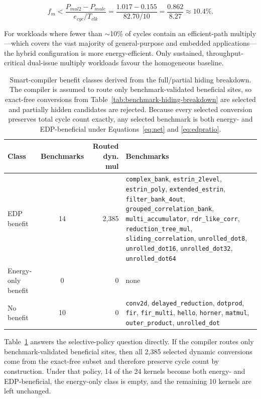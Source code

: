 \begin{equation}\label{eq:breakeven}
  f_m < \frac{P_{\mathit{mul2}} - P_{\mathit{mule}}}
             {e_{\mathit{cyc}} / T_{\mathit{clk}}}
      = \frac{1.017 - 0.155}{82.70 / 10}
      = \frac{0.862}{8.27}
      \approx 10.4\%.
\end{equation}

\noindent
For workloads where fewer than $\sim$10\% of cycles contain an
efficient-path multiply---which covers the vast majority of
general-purpose and embedded applications---the hybrid configuration
is more energy-efficient. Only sustained, throughput-critical dual-issue
multiply workloads favour the homogeneous baseline.

\begin{table}[t]
\centering
\caption{Smart-compiler benefit classes derived from the full/partial hiding breakdown. The compiler is assumed to route only benchmark-validated beneficial sites, so exact-free conversions from Table~\ref{tab:benchmark-hiding-breakdown} are selected and partially hidden candidates are rejected. Because every selected conversion preserves total cycle count exactly, any selected benchmark is both energy- and EDP-beneficial under Equations~\ref{eq:net} and \ref{eq:edpratio}.}
\label{tab:benchmark-benefit-classes}
\small
\begin{tabular}{l c r p{}}
\hline
Class & Benchmarks & Routed dyn. mul & Benchmarks \\
\hline
EDP benefit & 14 & 2,385 & \texttt{complex\_bank}, \texttt{estrin\_2level}, \texttt{estrin\_poly}, \texttt{extended\_estrin}, \texttt{filter\_bank\_4out}, \texttt{grouped\_correlation\_bank}, \texttt{multi\_accumulator}, \texttt{rdr\_like\_corr}, \texttt{reduction\_tree\_mul}, \texttt{sliding\_correlation}, \texttt{unrolled\_dot8}, \texttt{unrolled\_dot16}, \texttt{unrolled\_dot32}, \texttt{unrolled\_dot64} \\
Energy-only benefit & 0 & 0 & none \\
No benefit & 10 & 0 & \texttt{conv2d}, \texttt{delayed\_reduction}, \texttt{dotprod}, \texttt{fir}, \texttt{fir\_multi}, \texttt{hello}, \texttt{horner}, \texttt{matmul}, \texttt{outer\_product}, \texttt{unrolled\_dot} \\
\hline
\end{tabular}
\end{table}

Table~\ref{tab:benchmark-benefit-classes} answers the selective-policy
question directly. If the compiler routes only benchmark-validated
beneficial sites, then all 2,385 selected dynamic conversions come from
the exact-free subset and therefore preserve cycle count by
construction. Under that policy, 14 of the 24 kernels become both
energy- and EDP-beneficial, the energy-only class is empty, and the
remaining 10 kernels are left unchanged.

